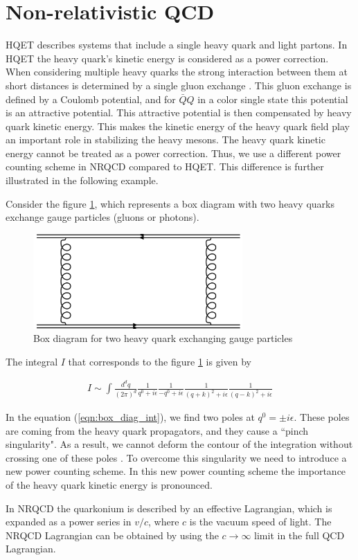 \section{Non-relativistic QCD}\label{NRQCD}
HQET describes systems that include a single heavy quark and light partons. In HQET the heavy quark's kinetic energy is considered as a power correction. When considering multiple heavy quarks the strong interaction between them at short distances is determined by a single gluon exchange \cite{Manohar:2000dt}. This gluon exchange is defined by a Coulomb potential, and for $\bar{Q}Q$ in a color single state this potential is an attractive potential. This attractive potential is then compensated by heavy quark kinetic energy. This makes the kinetic energy of the heavy quark field play an important role in stabilizing the heavy mesons. The heavy quark kinetic energy cannot be treated as a power correction. Thus, we use a different power counting scheme in NRQCD compared to HQET. This difference is further illustrated in the following example.\par
Consider the figure \ref{fig:Box_diag_two_glu_ex}, which represents a box diagram with two heavy quarks exchange gauge particles (gluons or photons).
\begin{figure}[H]
\centering
\includegraphics[width=8cm]{box diagram with two heavy quarks1.pdf}
\caption{\label{fig:Box_diag_two_glu_ex}
Box diagram for two heavy quark exchanging gauge particles}
\end{figure}
The integral $I$ that corresponds to the figure \ref{fig:Box_diag_two_glu_ex} is given by \cite{Petrov:2016azi}

\begin{eqnarray}\label{eqn:box_diag_int}
I \sim \int \frac{d^{d} q}{(2 \pi)^{d}} \frac{1}{q^{0}+i \epsilon} \frac{1}{-q^{0}+i \epsilon} \frac{1}{(q+k)^{2}+i \epsilon} \frac{1}{(q-k)^{2}+i \epsilon}
\end{eqnarray}

In the equation (\ref{eqn:box_diag_int}), we find two poles at $q^0=\pm i \epsilon$. These poles are coming from the heavy quark propagators, and they cause a ``pinch singularity". As a result, we cannot deform the contour of the integration without crossing one of these poles \cite{Petrov:2016azi}. To overcome this singularity we need to introduce a new power counting scheme. In this new power counting scheme the importance of the heavy quark kinetic energy is pronounced.\par
In NRQCD the quarkonium is described by an effective Lagrangian, which is expanded as a power series in $v/c$, where $c$ is the vacuum speed of light. The NRQCD Lagrangian can be obtained by using the $c\rightarrow \infty$ limit in the full QCD Lagrangian. 
